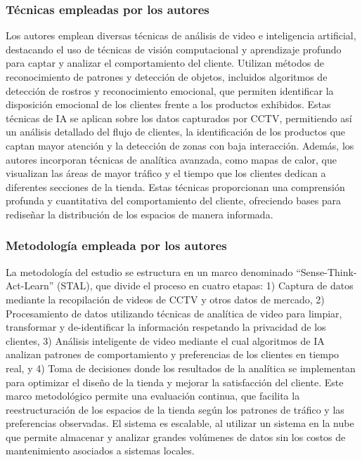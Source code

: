 \subsubsection{Técnicas empleadas por los autores}
Los autores emplean diversas técnicas de análisis de video e inteligencia artificial, destacando el uso de técnicas de visión computacional y aprendizaje profundo para captar y analizar el comportamiento del cliente. Utilizan métodos de reconocimiento de patrones y detección de objetos, incluidos algoritmos de detección de rostros y reconocimiento emocional, que permiten identificar la disposición emocional de los clientes frente a los productos exhibidos. Estas técnicas de IA se aplican sobre los datos capturados por CCTV, permitiendo así un análisis detallado del flujo de clientes, la identificación de los productos que captan mayor atención y la detección de zonas con baja interacción. Además, los autores incorporan técnicas de analítica avanzada, como mapas de calor, que visualizan las áreas de mayor tráfico y el tiempo que los clientes dedican a diferentes secciones de la tienda. Estas técnicas proporcionan una comprensión profunda y cuantitativa del comportamiento del cliente, ofreciendo bases para rediseñar la distribución de los espacios de manera informada.


\subsubsection{Metodología empleada por los autores}
La metodología del estudio se estructura en un marco denominado “Sense-Think-Act-Learn” (STAL), que divide el proceso en cuatro etapas: 1) Captura de datos mediante la recopilación de videos de CCTV y otros datos de mercado, 2) Procesamiento de datos utilizando técnicas de analítica de video para limpiar, transformar y de-identificar la información respetando la privacidad de los clientes, 3) Análisis inteligente de video mediante el cual algoritmos de IA analizan patrones de comportamiento y preferencias de los clientes en tiempo real, y 4) Toma de decisiones donde los resultados de la analítica se implementan para optimizar el diseño de la tienda y mejorar la satisfacción del cliente. Este marco metodológico permite una evaluación continua, que facilita la reestructuración de los espacios de la tienda según los patrones de tráfico y las preferencias observadas. El sistema es escalable, al utilizar un sistema en la nube que permite almacenar y analizar grandes volúmenes de datos sin los costos de mantenimiento asociados a sistemas locales.

